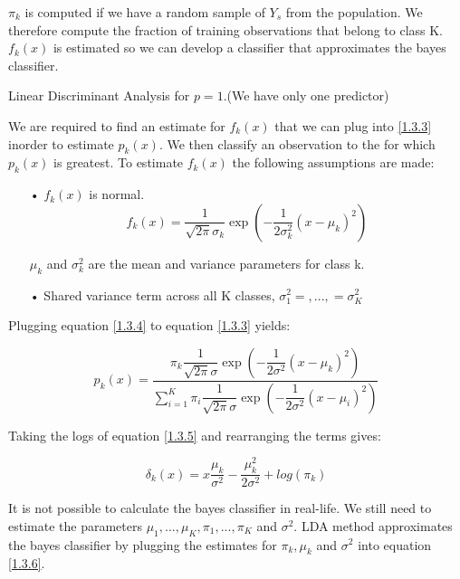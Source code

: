 $\pi_{k}$ is computed if we have a random sample of $Y_{s}$ from the population. We therefore compute the fraction of training observations that belong to class K.$f_{k}(x)$ is estimated so we can develop a classifier that approximates the bayes classifier.

\begin{center}
Linear Discriminant Analysis for $p=1$.(We  have only one predictor)
\end{center}

We are required to find an estimate for $f_{k}(x)$ that we can plug into \eqref{1.3.3} inorder to estimate $p_{k}(x)$. We then classify an observation to the for which $p_{k}(x)$ is greatest. To estimate $f_{k}(x)$ the following assumptions are made:

\begin{enumerate}
\item[•] $f_{k}(x)$ is normal.
\begin{equation}
f_{k}(x)=\dfrac{1}{\sqrt{2 \pi}\sigma_{k}} \exp \left(-\dfrac{1}{2 \sigma^2_{k}}(x-\mu_{k})^2\right) \label{1.3.4}
\end{equation}

$\mu_{k}$ and $\sigma_{k}^2$ are the mean and variance parameters for class k.

\item[•] Shared variance term across all K classes, $\sigma_{1}^2=,...,=\sigma_{K}^2$
\end{enumerate}

Plugging equation \eqref{1.3.4} to equation \eqref{1.3.3} yields:

\begin{equation}
p_{k}(x)=\dfrac{\pi_{k}\dfrac{1}{\sqrt{2 \pi}\sigma} \exp \left(-\dfrac{1}{2 \sigma^2}(x-\mu_{k})^2\right)}{\sum_{i=1}^{K} \pi_{i}\dfrac{1}{\sqrt{2 \pi}\sigma} \exp \left(-\dfrac{1}{2 \sigma^2}(x-\mu_{i})^2\right)} \label{1.3.5}
\end{equation}

Taking the logs of equation \eqref{1.3.5} and rearranging the terms gives:

\begin{equation}
\delta_{k}(x)=x \dfrac{\mu_{k}}{\sigma^2}-\dfrac{\mu^2_{k}}{2 \sigma^2}+log(\pi_k) \label{1.3.6}
\end{equation}

It is not possible to calculate the bayes  classifier in real-life. We still need to estimate the parameters $\mu_{1},...,\mu_{K}, \pi_{1},...,\pi_{K}$ and $\sigma^2$. LDA method approximates the bayes classifier by plugging the estimates for $\pi_{k}, \mu_{k}$ and $\sigma^2$ into equation \eqref{1.3.6}.

